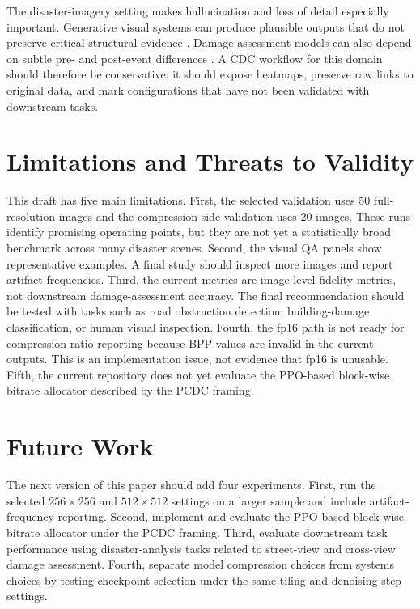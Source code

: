 \documentclass[conference]{IEEEtran}
\begin{document}
The disaster-imagery setting makes hallucination and loss of detail especially important. Generative visual systems can produce plausible outputs that do not preserve critical structural evidence \cite{yang2026satellite}. Damage-assessment models can also depend on subtle pre- and post-event differences \cite{yang2025hyperlocal}. A CDC workflow for this domain should therefore be conservative: it should expose heatmaps, preserve raw links to original data, and mark configurations that have not been validated with downstream tasks.

\section{Limitations and Threats to Validity}

This draft has five main limitations. First, the selected validation uses 50 full-resolution images and the compression-side validation uses 20 images. These runs identify promising operating points, but they are not yet a statistically broad benchmark across many disaster scenes. Second, the visual QA panels show representative examples. A final study should inspect more images and report artifact frequencies. Third, the current metrics are image-level fidelity metrics, not downstream damage-assessment accuracy. The final recommendation should be tested with tasks such as road obstruction detection, building-damage classification, or human visual inspection. Fourth, the fp16 path is not ready for compression-ratio reporting because BPP values are invalid in the current outputs. This is an implementation issue, not evidence that fp16 is unusable. Fifth, the current repository does not yet evaluate the PPO-based block-wise bitrate allocator described by the PCDC framing.

\section{Future Work}

The next version of this paper should add four experiments. First, run the selected $256 \times 256$ and $512 \times 512$ settings on a larger sample and include artifact-frequency reporting. Second, implement and evaluate the PPO-based block-wise bitrate allocator under the PCDC framing. Third, evaluate downstream task performance using disaster-analysis tasks related to street-view and cross-view damage assessment. Fourth, separate model compression choices from systems choices by testing checkpoint selection under the same tiling and denoising-step settings.
\end{document}
